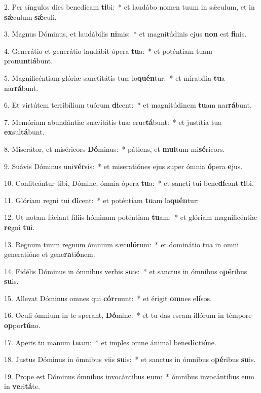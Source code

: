 2. Per síngulos dies benedícam \textbf{ti}bi:~*  et laudábo nomen tuum in sǽculum, et in \textbf{sǽ}culum \textbf{sǽ}culi.\

3. Magnus Dóminus, et laudábilis \textbf{ni}mis:~*  et magnitúdinis ejus \textbf{non} est \textbf{fi}nis.\

4. Generátio et generátio laudábit ópera \textbf{tu}a:~*  et poténtiam tuam pro\textbf{nun}ti\textbf{á}bunt.\

5. Magnificéntiam glóriæ sanctitátis tuæ lo\textbf{quén}tur:~*  et mirabília \textbf{tu}a nar\textbf{rá}bunt.\

6. Et virtútem terribílium tuórum \textbf{di}cent:~*  et magnitúdinem \textbf{tu}am nar\textbf{rá}bunt.\

7. Memóriam abundántiæ suavitátis tuæ eruc\textbf{tá}bunt:~*  et justítia tua \textbf{ex}sul\textbf{tá}bunt.\

8. Miserátor, et miséricors \textbf{Dó}minus:~*  pátiens, et \textbf{mul}tum mi\textbf{sé}ricors.\

9. Suávis Dóminus uni\textbf{vér}sis:~*  et miseratiónes ejus super ómnia \textbf{ó}pera \textbf{e}jus.\

10. Confiteántur tibi, Dómine, ómnia ópera \textbf{tu}a:~*  et sancti tui bene\textbf{dí}cant \textbf{ti}bi.\

11. Glóriam regni tui \textbf{di}cent:~*  et poténtiam \textbf{tu}am lo\textbf{quén}tur:\

12. Ut notam fáciant fíliis hóminum poténtiam \textbf{tu}am:~*  et glóriam magnificéntiæ \textbf{re}gni \textbf{tu}i.\

13. Regnum tuum regnum ómnium sæcu\textbf{ló}rum:~*  et dominátio tua in omni generatióne et gene\textbf{ra}ti\textbf{ó}nem.\

14. Fidélis Dóminus in ómnibus verbis \textbf{su}is:~*  et sanctus in ómnibus o\textbf{pé}ribus \textbf{su}is.\

15. Allevat Dóminus omnes qui \textbf{cór}ruunt:~*  et érigit \textbf{om}nes e\textbf{lí}sos.\

16. Oculi ómnium in te sperant, \textbf{Dó}mine:~*  et tu das escam illórum in témpore \textbf{op}por\textbf{tú}no.\

17. Aperis tu manum \textbf{tu}am:~*  et imples omne ánimal bene\textbf{dic}ti\textbf{ó}ne.\

18. Justus Dóminus in ómnibus viis \textbf{su}is:~*  et sanctus in ómnibus o\textbf{pé}ribus \textbf{su}is.\

19. Prope est Dóminus ómnibus invocántibus \textbf{e}um:~*  ómnibus invocántibus eum in \textbf{ve}ri\textbf{tá}te.\

